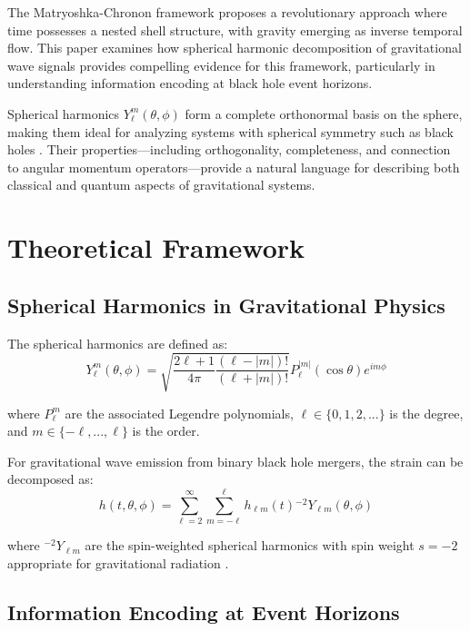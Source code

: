 \documentclass[12pt,a4paper]{article}
\begin{document}
The Matryoshka-Chronon framework \cite{jenkins2025matryoshka,jenkins2025quantum} proposes a revolutionary approach where time possesses a nested shell structure, with gravity emerging as inverse temporal flow. This paper examines how spherical harmonic decomposition of gravitational wave signals provides compelling evidence for this framework, particularly in understanding information encoding at black hole event horizons.

Spherical harmonics $Y_\ell^m(\theta,\phi)$ form a complete orthonormal basis on the sphere, making them ideal for analyzing systems with spherical symmetry such as black holes \cite{berti2009eigenvalues}. Their properties—including orthogonality, completeness, and connection to angular momentum operators—provide a natural language for describing both classical and quantum aspects of gravitational systems.

\section{Theoretical Framework}

\subsection{Spherical Harmonics in Gravitational Physics}

The spherical harmonics are defined as:
\begin{equation}
Y_\ell^m(\theta, \phi) = \sqrt{\frac{2\ell+1}{4\pi}\frac{(\ell-|m|)!}{(\ell+|m|)!}} P_\ell^{|m|}(\cos\theta) e^{im\phi}
\end{equation}

where $P_\ell^m$ are the associated Legendre polynomials, $\ell \in \{0,1,2,...\}$ is the degree, and $m \in \{-\ell,...,\ell\}$ is the order.

For gravitational wave emission from binary black hole mergers, the strain can be decomposed as:
\begin{equation}
h(t,\theta,\phi) = \sum_{\ell=2}^{\infty} \sum_{m=-\ell}^{\ell} h_{\ell m}(t) {}^{-2}Y_{\ell m}(\theta,\phi)
\end{equation}

where ${}^{-2}Y_{\ell m}$ are the spin-weighted spherical harmonics with spin weight $s=-2$ appropriate for gravitational radiation \cite{thorne1980multipole}.

\subsection{Information Encoding at Event Horizons}
\end{document}
